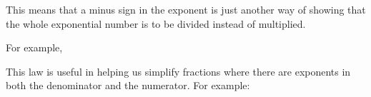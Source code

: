         \label{m38359*id64624}This means that a minus sign in the exponent is just another way of showing that the whole exponential number is to be divided instead of multiplied.\par 
        \label{m38359*id64630}For example,\par 
        \label{m38359*id64634}\nopagebreak\noindent{}
\label{m38359*eip-294}This law is useful in helping us simplify fractions where there are exponents in both the denominator and the numerator. For example:
\label{m38359*id7902}\nopagebreak\noindent{}
